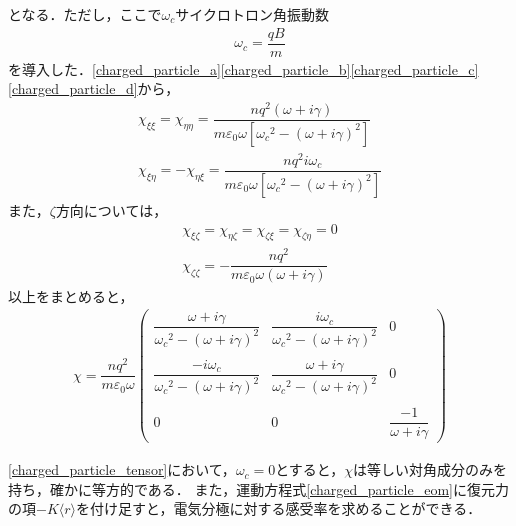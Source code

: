 となる．ただし，ここで$\omega_c$サイクロトロン角振動数
\begin{align}
  \omega_c=\dfrac{qB}{m}
\end{align}
を導入した．\eqref{charged_particle_a}\eqref{charged_particle_b}\eqref{charged_particle_c}\eqref{charged_particle_d}から，
\begin{align}
  \chi_{\xi\xi}=\chi_{\eta\eta}=\dfrac{nq^2(\omega+i\gamma)}{m\varepsilon_0\omega[{\omega_c}^2 - (\omega+i\gamma)^2]} \\
  \chi_{\xi\eta}= - \chi_{\eta\xi}=\dfrac{nq^2i\omega_c}{m\varepsilon_0\omega[{\omega_c}^2 - (\omega+i\gamma)^2]}
\end{align}
また，$\zeta$方向については，
\begin{align}
  \chi_{\xi\zeta}=\chi_{\eta\zeta}=\chi_{\zeta\xi}=\chi_{\zeta\eta}=0 \\
  \chi_{\zeta\zeta}= - \dfrac{nq^2}{m\varepsilon_0\omega(\omega+i\gamma)}
\end{align}
以上をまとめると，
\begin{align}
  \chi =
  \dfrac{nq^2}{m\varepsilon_0\omega}\left(
  \begin{array}{ccc}
    \dfrac{\omega+i\gamma}{{\omega_c}^2 - (\omega+i\gamma)^2} & \dfrac{i\omega_c}{{\omega_c}^2 - (\omega+i\gamma)^2} & 0 \\ \\
    \dfrac{ - i\omega_c}{{\omega_c}^2 - (\omega+i\gamma)^2} & \dfrac{\omega+i\gamma}{{\omega_c}^2 - (\omega+i\gamma)^2} & 0 \\ \\
    0 & 0 & \dfrac{ - 1}{\omega+i\gamma}
  \end{array}
  \right)
  \label{charged_particle_tensor}
\end{align}

\eqref{charged_particle_tensor}において，$\omega_c=0$とすると，$\chi$は等しい対角成分のみを持ち，確かに等方的である．
また，運動方程式\eqref{charged_particle_eom}に復元力の項$ - K\langle{r}\rangle$を付け足すと，電気分極に対する感受率を求めることができる．

